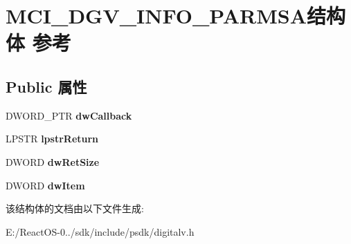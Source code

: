 \hypertarget{struct_m_c_i___d_g_v___i_n_f_o___p_a_r_m_s_a}{}\section{M\+C\+I\+\_\+\+D\+G\+V\+\_\+\+I\+N\+F\+O\+\_\+\+P\+A\+R\+M\+S\+A结构体 参考}
\label{struct_m_c_i___d_g_v___i_n_f_o___p_a_r_m_s_a}
\subsection*{Public 属性}
\begin{DoxyCompactItemize}
\item 
\mbox{\label{struct_m_c_i___d_g_v___i_n_f_o___p_a_r_m_s_a_ab72e5a2081090b1cf4fdee0ef1cd1713}} 
D\+W\+O\+R\+D\+\_\+\+P\+TR {\bfseries dw\+Callback}
\item 
\mbox{\label{struct_m_c_i___d_g_v___i_n_f_o___p_a_r_m_s_a_a49c26927a4018c60b1e9627d2d598937}} 
L\+P\+S\+TR {\bfseries lpstr\+Return}
\item 
\mbox{\label{struct_m_c_i___d_g_v___i_n_f_o___p_a_r_m_s_a_a06604df4087dd49581a19af0ad5a6e0e}} 
D\+W\+O\+RD {\bfseries dw\+Ret\+Size}
\item 
\mbox{\label{struct_m_c_i___d_g_v___i_n_f_o___p_a_r_m_s_a_ad6a4fe37409ebb0e4219c650a8744785}} 
D\+W\+O\+RD {\bfseries dw\+Item}
\end{DoxyCompactItemize}


该结构体的文档由以下文件生成\+:\begin{DoxyCompactItemize}
\item 
E\+:/\+React\+O\+S-\/0../sdk/include/psdk/digitalv.\+h\end{DoxyCompactItemize}
